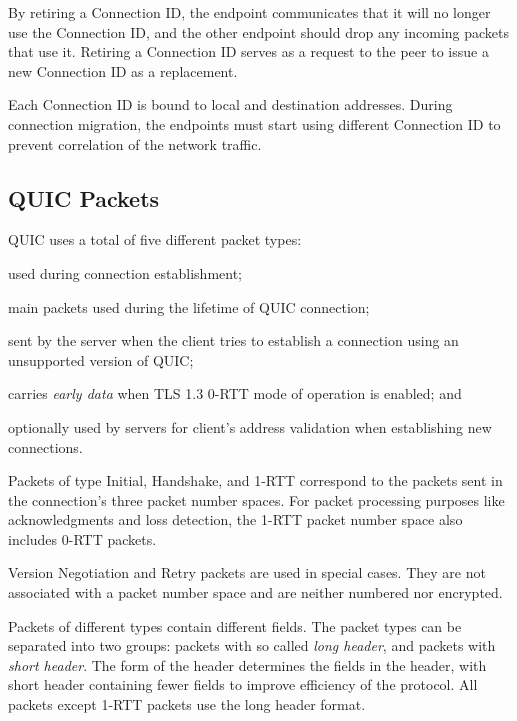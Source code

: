 By retiring a Connection ID, the endpoint communicates that it will no longer use the Connection ID,
and the other endpoint should drop any incoming packets that use it. Retiring a Connection ID serves
as a request to the peer to issue a new Connection ID as a replacement.

Each Connection ID is bound to local and destination addresses. During connection migration, the
endpoints must start using different Connection ID to prevent correlation of the network traffic.

\subsection{QUIC Packets}

QUIC uses a total of five different packet types:

\begin{enumerate}

   used during connection establishment;

   main packets used during the lifetime of QUIC connection;

   sent by the server when the client tries to establish a connection
  using an unsupported version of QUIC\@;

   carries \textit{early data} when TLS 1.3 0-RTT mode of operation is enabled; and

   optionally used by servers for client's address validation when establishing new
  connections.

\end{enumerate}

Packets of type Initial, Handshake, and 1-RTT correspond to the packets sent in the connection's
three packet number spaces. For packet processing purposes like acknowledgments and loss detection,
the 1-RTT packet number space also includes 0-RTT packets.

Version Negotiation and Retry packets are used in special cases. They are not associated with a
packet number space and are neither numbered nor encrypted.

Packets of different types contain different fields. The packet types can be separated into two
groups: packets with so called \textit{long header}, and packets with \textit{short header}. The
form of the header determines the fields in the header, with short header containing fewer fields to
improve efficiency of the protocol. All packets except 1-RTT packets use the long header format.

